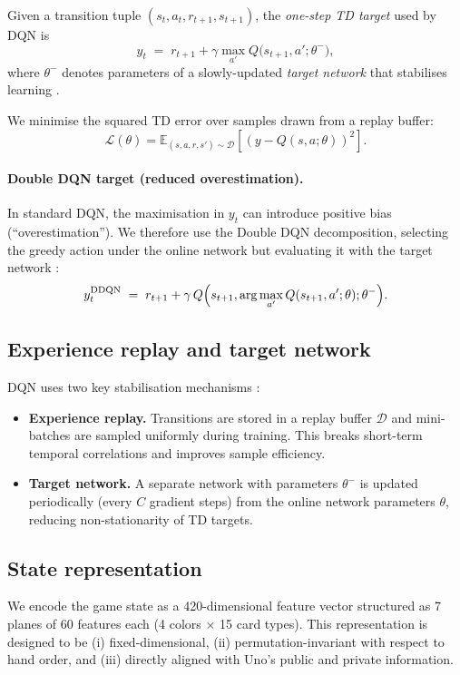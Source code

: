 \documentclass[11pt]{article}
\begin{document}
Given a transition tuple $(s_t,a_t,r_{t+1},s_{t+1})$, the \emph{one-step TD target} used by DQN is
\begin{equation}
  y_t \;=\; r_{t+1} + \gamma\max_{a'} Q\bigl(s_{t+1},a';\theta^{-}\bigr),
\end{equation}
where $\theta^{-}$ denotes parameters of a slowly-updated \emph{target network} that stabilises learning \parencite{mnih2015human}.

We minimise the squared TD error over samples drawn from a replay buffer:
\begin{equation}
\mathcal{L}(\theta)=\mathbb{E}_{(s,a,r,s')\sim\mathcal{D}}\left[\left(y - Q(s,a;\theta)\right)^2\right].
\end{equation}

\paragraph{Double DQN target (reduced overestimation).}
In standard DQN, the maximisation in $y_t$ can introduce positive bias (``overestimation''). We therefore use the Double DQN decomposition, selecting the greedy action under the online network but evaluating it with the target network \parencite{vanhasselt2016double}:
\begin{equation}
  y_t^{\mathrm{DDQN}} \;=\; r_{t+1} + \gamma\,Q\Bigl(s_{t+1},\arg\max_{a'}Q(s_{t+1},a';\theta);\theta^{-}\Bigr).
\end{equation}

\subsection{Experience replay and target network}
DQN uses two key stabilisation mechanisms \parencite{mnih2015human}:
\begin{itemize}
  \item \textbf{Experience replay.} Transitions are stored in a replay buffer $\mathcal{D}$ and mini-batches are sampled uniformly during training. This breaks short-term temporal correlations and improves sample efficiency.
  \item \textbf{Target network.} A separate network with parameters $\theta^{-}$ is updated periodically (every $C$ gradient steps) from the online network parameters $\theta$, reducing non-stationarity of TD targets.
\end{itemize}

\FloatBarrier
\subsection{State representation}
We encode the game state as a 420-dimensional feature vector structured as 7 planes of 60 features each (4 colors $\times$ 15 card types). This representation is designed to be (i) fixed-dimensional, (ii) permutation-invariant with respect to hand order, and (iii) directly aligned with Uno's public and private information.
\end{document}
